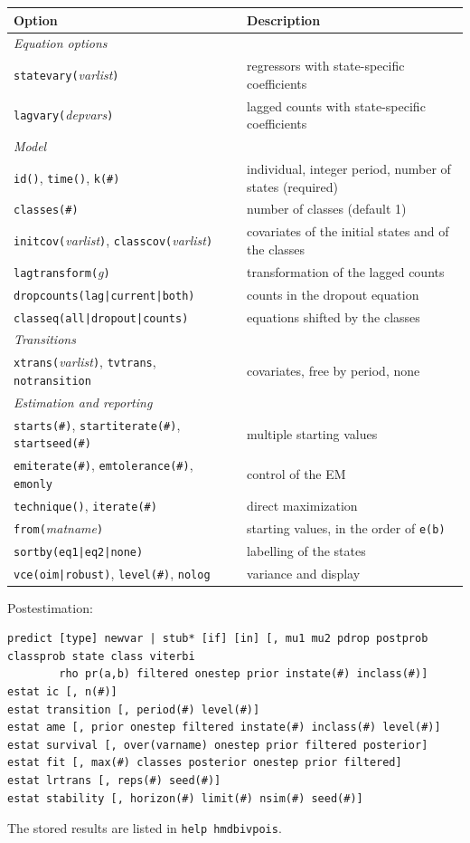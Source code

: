 \documentclass[11pt,a4paper]{article}
\newcommand{\cmd}[1]{\texttt{#1}}
\begin{document}
\begin{center}
\small
\begin{tabularx}{\textwidth}{lX}
\toprule
Option & Description\\
\midrule
\multicolumn{2}{l}{\emph{Equation options}}\\
\cmd{statevary(}\textit{varlist}\cmd{)} & regressors with state-specific coefficients\\
\cmd{lagvary(}\textit{depvars}\cmd{)} & lagged counts with state-specific coefficients\\
\midrule
\multicolumn{2}{l}{\emph{Model}}\\
\cmd{id()}, \cmd{time()}, \cmd{k(\#)} & individual, integer period, number of states (required)\\
\cmd{classes(\#)} & number of classes (default 1)\\
\cmd{initcov(}\textit{varlist}\cmd{)}, \cmd{classcov(}\textit{varlist}\cmd{)} & covariates of the initial states and of the classes\\
\cmd{lagtransform(}\textit{g}\cmd{)} & transformation of the lagged counts\\
\cmd{dropcounts(lag|current|both)} & counts in the dropout equation\\
\cmd{classeq(all|dropout|counts)} & equations shifted by the classes\\
\midrule
\multicolumn{2}{l}{\emph{Transitions}}\\
\cmd{xtrans(}\textit{varlist}\cmd{)}, \cmd{tvtrans}, \cmd{notransition} & covariates, free by period, none\\
\midrule
\multicolumn{2}{l}{\emph{Estimation and reporting}}\\
\cmd{starts(\#)}, \cmd{startiterate(\#)}, \cmd{startseed(\#)} & multiple starting values\\
\cmd{emiterate(\#)}, \cmd{emtolerance(\#)}, \cmd{emonly} & control of the EM\\
\cmd{technique()}, \cmd{iterate(\#)} & direct maximization\\
\cmd{from(}\textit{matname}\cmd{)} & starting values, in the order of \cmd{e(b)}\\
\cmd{sortby(eq1|eq2|none)} & labelling of the states\\
\cmd{vce(oim|robust)}, \cmd{level(\#)}, \cmd{nolog} & variance and display\\
\bottomrule
\end{tabularx}
\end{center}

Postestimation:
\begin{lstlisting}
predict [type] newvar | stub* [if] [in] [, mu1 mu2 pdrop postprob classprob state class viterbi
        rho pr(a,b) filtered onestep prior instate(#) inclass(#)]
estat ic [, n(#)]
estat transition [, period(#) level(#)]
estat ame [, prior onestep filtered instate(#) inclass(#) level(#)]
estat survival [, over(varname) onestep prior filtered posterior]
estat fit [, max(#) classes posterior onestep prior filtered]
estat lrtrans [, reps(#) seed(#)]
estat stability [, horizon(#) limit(#) nsim(#) seed(#)]
\end{lstlisting}
The stored results are listed in \cmd{help hmdbivpois}.
\end{document}
